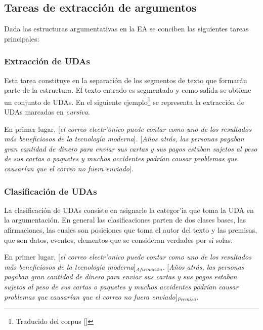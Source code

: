 \subsection{Tareas de extracción de argumentos}

Dada las estructuras argumentativas en la EA se conciben las siguientes tareas principales:

\subsubsection{Extracción de UDAs}

Esta tarea constituye en la separación de los segmentos de texto que formarán parte de la estructura.
El texto entrado es segmentado y como salida se obtiene un conjunto de UDAs. En el siguiente 
ejemplo\footnote{Traducido del corpus [\cite{stab2014identifying}]} se representa 
la extracción de UDAs marcadas en \emph{cursiva}.

\begin{adjustwidth}{25pt}{25pt}
    En primer lugar, [\emph{el correo electr'onico puede contar como uno de los resultados
    más beneficiosos de la tecnología moderna}]. [\emph{Años atrás, las personas pagaban gran cantidad de dinero para 
    enviar sus cartas y sus pagos estaban sujetos al peso de sus cartas o paquetes y muchos accidentes podrían 
    causar problemas que causarían que el correo no fuera enviado}].
\end{adjustwidth}

\subsubsection{Clasificación de UDAs}

La clasificación de UDAs consiste en asignarle la categor'ia que toma la UDA en la argumentación. En general 
las clasificaciones parten de dos clases bases, las afirmaciones, las cuales son posiciones que toma el 
autor del texto y las premisas, que son datos, eventos, elementos que se consideran verdades por sí solas.  

\begin{adjustwidth}{25pt}{25pt}
    En primer lugar, [\emph{el correo electr'onico puede contar como uno de los resultados
    más beneficiosos de la tecnología moderna}]$_{Afirmación}$. [\emph{Años atrás, las personas pagaban gran cantidad de dinero para 
    enviar sus cartas y sus pagos estaban sujetos al peso de sus cartas o paquetes y muchos accidentes podrían 
    causar problemas que causarían que el correo no fuera enviado}]$_{Premisa}$.
\end{adjustwidth}


